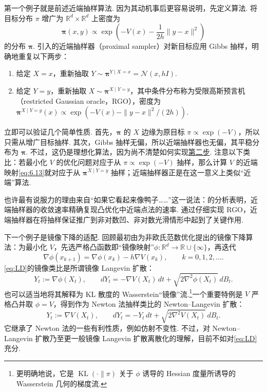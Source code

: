 第一个例子就是前述近端抽样算法. 因为其动机事后更容易说明，先定义算法. 将目标分布 $\pi$ 增广为 $\mathbb R^d\times\mathbb R^d$ 上密度为
$$
\boldsymbol\pi(x,y)\propto\exp\left(-V(x)-\frac1{2h}\|y-x\|^2\right)
$$
的分布 $\boldsymbol\pi$. \cite{ref203}引入的近端抽样器（proximal sampler）对新目标应用 Gibbs 抽样，明确地重复以下两步：
\begin{enumerate}
\item\label{item:6.prox.1} 给定 $X=x$，重新抽取 $Y\sim\boldsymbol\pi^{Y\mid X=x}=\mathcal N(x,hI)$.
\item\label{item:6.prox.2} 给定 $Y=y$，重新抽取 $X\sim\boldsymbol\pi^{X\mid Y=y}$，其中条件分布称为受限高斯预言机（restricted Gaussian oracle，RGO），密度为 $\boldsymbol\pi^{X\mid Y=y}(x)\propto\exp(-V(x)-\|y-x\|^2/(2h))$.
\end{enumerate}
立即可以验证几个简单性质. 首先，$\boldsymbol\pi$ 的 $X$ 边缘为原目标 $\pi\propto\exp(-V)$，所以只需从增广目标抽样. 其次，Gibbs 抽样无偏，所以近端抽样器也无偏，其平稳分布为 $\boldsymbol\pi$. 不过，这仍是理想化算法，因为尚不清楚如何实现\hyperref[item:6.prox.2]{第二步}. 注意以下类比：若最小化 $V$ 的优化问题对应于从 $\pi\propto\exp(-V)$ 抽样，那么计算 $V$ 的近端映射\eqref{eq:6.13}就对应于从 $\boldsymbol\pi^{X\mid Y=y}$ 抽样；近端抽样器正是在这一意义上类似“近端”算法.

也许最有说服力的理由来自“如果它看起来像鸭子……”这一说法：\cite{ref71,ref203}的分析表明，近端抽样器的收敛速率精确复现凸优化中近端点法的速率. 通过仔细实现 RGO，近端抽样器在将抽样保证推广到非对数凹、非对数光滑情形中起到了关键作用\cite{ref11,ref130}.

下一个例子是镜像下降的适配. 回顾最初由\cite{ref234}为非欧氏范数优化提出的镜像下降算法：为最小化 $V$，先选严格凸函数即“镜像映射”$\phi:\mathbb R^d\to\mathbb R\cup\{\infty\}$，再迭代
$$
\nabla\phi(x_{k+1})=\nabla\phi(x_k)-h\nabla V(x_k),\qquad k=0,1,2,\ldots.
$$
\eqref{eq:LD}的镜像类比是所谓镜像 Langevin 扩散\cite{ref80,ref330}：
$$
Y_t:=\nabla\phi(X_t),\qquad
dY_t=-\nabla V(X_t)\,dt+\sqrt{2\nabla^2\phi(X_t)}\,dB_t.
$$
也可以适当地将其解释为 KL 散度的 Wasserstein“镜像”流.\footnote{更明确地说，它是 $\operatorname{KL}(\cdot\|\pi)$ 关于 $\phi$ 诱导的 Hessian 度量所诱导的 Wasserstein 几何的梯度流.}一个重要特例是 $V$ 严格凸并取 $\phi=V$，得到作为 Newton 法抽样类比的 Newton--Langevin 扩散：
$$
Y_t:=\nabla V(X_t),\qquad
dY_t=-Y_t\,dt+\sqrt{2\nabla^2V(X_t)}\,dB_t.
$$
它继承了 Newton 法的一些有利性质，例如仿射不变性. 不过，对 Newton--Langevin 扩散乃至更一般镜像 Langevin 扩散离散化的理解，目前不如对\eqref{eq:LD}充分.

